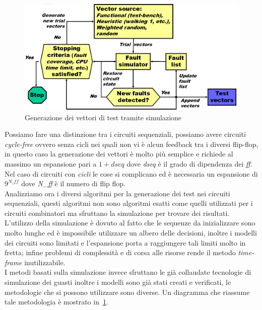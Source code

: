 \begin{figure}
\centering
\includegraphics[scale=0.4]{img/simumeth.png}
\caption{Generazione dei vettori di test tramite simulazione}\label{fig:simumeth}
\end{figure}
Possiamo fare una distinzione tra i circuiti sequenziali, possiamo avere circuiti \emph{cycle-free} ovvero senza cicli nei quali non vi è alcun feedback tra i diversi flip-flop, in questo caso la generazione dei vettori è molto più semplice e richiede al massimo un espansione pari a $1+dseq$ dove \emph{dseq} è il grado di dipendenza dei \emph{ff}. Nel caso di circuiti con \emph{cicli} le cose si complicano ed è necessaria un espansione di $9^{N\_ff}$ dove \emph{N\_ff} è il numero di flip flop.\\
Analizziamo ora i diversi algoritmi per la generazione dei test nei circuiti sequenziali, questi algoritmi non sono algoritmi esatti come quelli utilizzati per i circuiti combinatori ma sfruttano la simulazione per trovare dei risultati. L'utilizzo della simulazione è dovuto al fatto che le sequenze da inizializzare sono molto lunghe ed è impossibile utilizzare un albero delle decisioni, inoltre i modelli dei circuiti sono limitati e l'espansione porta a raggiungere tali limiti molto in fretta; infine problemi di complessità e di corsa alle risorse rende il metodo \emph{time-frame} inutilizzabile.\\
I metodi basati sulla simulazione invece sfruttano le già collaudate tecnologie di simulazione dei guasti inoltre i modelli sono già stati creati e verificati, le metodologie che si possono utilizzare sono diverse.
Un diagramma che riassume tale metodologia è mostrato in \figurename\,\ref{fig:simumeth}.
